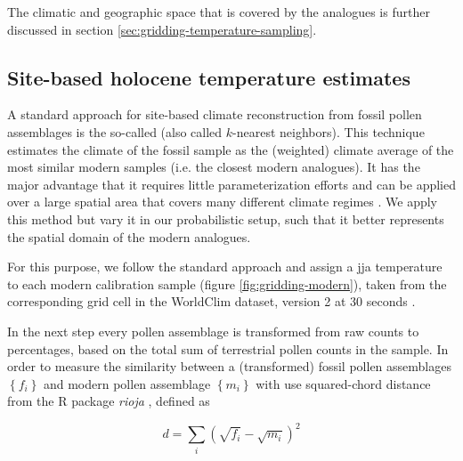 \begin{refsection}
The climatic and geographic space that is covered by the analogues is further discussed in section \ref{sec:gridding-temperature-sampling}.

\subsection{Site-based holocene temperature estimates}  \label{sec:gridding-mat}
A standard approach for site-based climate reconstruction from fossil pollen assemblages is the so-called  (also called $k$-nearest neighbors). This technique estimates the climate of the fossil sample as the (weighted) climate average of the most similar modern samples (i.e. the closest modern analogues). It has the major advantage that it requires little parameterization efforts and can be applied over a large spatial area that covers many different climate regimes \citep{MauriDavisCollinsEtAl2015}. We apply this method but vary it in our probabilistic setup, such that it better represents the spatial domain of the modern analogues.

For this purpose, we follow the standard approach and assign a \gls{jja} temperature to each modern calibration sample (figure \ref{fig:gridding-modern}), taken from the corresponding grid cell in the WorldClim dataset, version 2 at 30 seconds \citep{FickHijmans2017}.

In the next step every pollen assemblage is transformed from raw counts to percentages, based on the total sum of terrestrial pollen counts in the sample. In order to measure the similarity between a (transformed) fossil pollen assemblages $\left\lbrace f_{i}\right\rbrace$ and modern pollen assemblage $\left\lbrace m_{i}\right\rbrace$ with use squared-chord distance from the R package \textit{rioja} \citep{Juggins2017}, defined as

\begin{equation*}
d = \sum_{i}\left(\sqrt{f_{i}} - \sqrt{m_{i}}\right)^2
\end{equation*}


\end{refsection}
